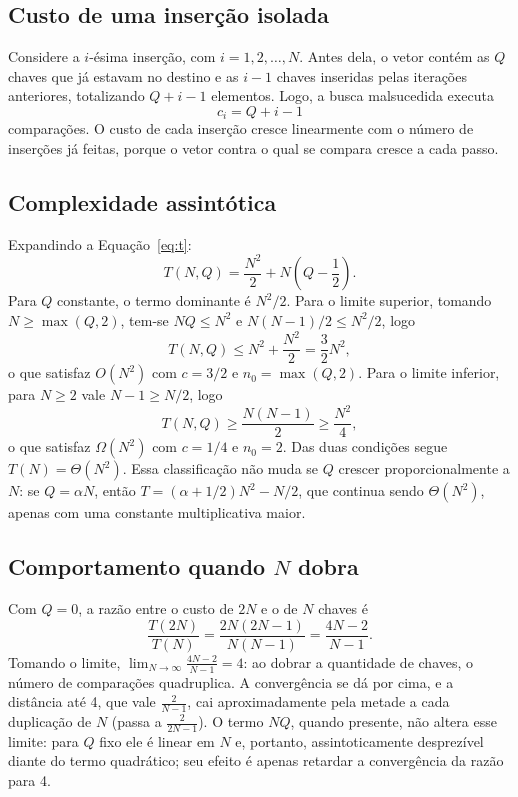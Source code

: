 \documentclass[11pt,a4paper]{article}
\begin{document}
\subsection{Custo de uma inserção isolada}

Considere a $i$-ésima inserção, com $i=1,2,\ldots,N$. Antes dela, o vetor contém as $Q$ chaves que já estavam no destino e as $i-1$ chaves inseridas pelas iterações anteriores, totalizando $Q+i-1$ elementos. Logo, a busca malsucedida executa
\begin{equation}
c_i=Q+i-1
\label{eq:ci}
\end{equation}
comparações. O custo de cada inserção cresce linearmente com o número de inserções já feitas, porque o vetor contra o qual se compara cresce a cada passo.

\subsection{Complexidade assintótica}

Expandindo a Equação~\eqref{eq:t}:
\[
T(N,Q)=\frac{N^2}{2}+N\left(Q-\frac12\right).
\]
Para $Q$ constante, o termo dominante é $N^2/2$. Para o limite superior, tomando $N\ge\max(Q,2)$, tem-se $NQ\le N^2$ e $N(N-1)/2\le N^2/2$, logo
\[
T(N,Q)\le N^2+\frac{N^2}{2}=\frac32N^2,
\]
o que satisfaz $O(N^2)$ com $c=3/2$ e $n_0=\max(Q,2)$. Para o limite inferior, para $N\ge2$ vale $N-1\ge N/2$, logo
\[
T(N,Q)\ge\frac{N(N-1)}{2}\ge\frac{N^2}{4},
\]
o que satisfaz $\Omega(N^2)$ com $c=1/4$ e $n_0=2$. Das duas condições segue $T(N)=\Theta(N^2)$. Essa classificação não muda se $Q$ crescer proporcionalmente a $N$: se $Q=\alpha N$, então $T=(\alpha+1/2)N^2-N/2$, que continua sendo $\Theta(N^2)$, apenas com uma constante multiplicativa maior.

\subsection{Comportamento quando $N$ dobra}

Com $Q=0$, a razão entre o custo de $2N$ e o de $N$ chaves é
\begin{equation}
\frac{T(2N)}{T(N)}=\frac{2N(2N-1)}{N(N-1)}=\frac{4N-2}{N-1}.
\label{eq:razao}
\end{equation}
Tomando o limite, $\lim_{N\to\infty}\frac{4N-2}{N-1}=4$: ao dobrar a quantidade de chaves, o número de comparações quadruplica. A convergência se dá por cima, e a distância até 4, que vale $\frac{2}{N-1}$, cai aproximadamente pela metade a cada duplicação de $N$ (passa a $\frac{2}{2N-1}$). O termo $NQ$, quando presente, não altera esse limite: para $Q$ fixo ele é linear em $N$ e, portanto, assintoticamente desprezível diante do termo quadrático; seu efeito é apenas retardar a convergência da razão para 4.
\end{document}
